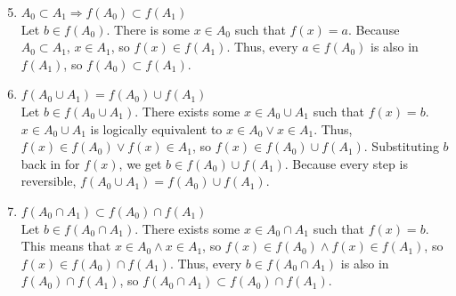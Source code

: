 \documentclass{article}
\begin{document}
\begin{enumerate}
\begin{enumerate}
                  \setcounter{enumii}{4}
                  \item $A_{0} \subset A_{1} \Rightarrow f(A_{0})  \subset f(A_{1})$\\
                        Let $b \in f(A_{0})$. There is some $x \in A_{0}$ such that $f(x) = a$. Because $A_{0} \subset A_{1}$, $x \in A_{1}$, so $f(x) \in f(A_{1})$. Thus, every $a \in f(A_{0})$ is also in $f(A_{1})$, so $f(A_{0}) \subset f(A_{1})$.
                  \item $f(A_{0} \cup A_{1}) = f(A_{0}) \cup f(A_{1})$\\
                        Let $b \in f(A_{0} \cup A_{1})$. There exists some $x \in A_{0} \cup A_{1}$ such that $f(x) = b$. $x \in A_{0} \cup A_{1}$ is logically equivalent to $x \in A_{0} \lor x \in A_{1}$. Thus, $f(x) \in f(A_{0}) \lor f(x) \in A_{1}$, so $f(x) \in f(A_{0}) \cup f(A_{1})$. Substituting $b$ back in for $f(x)$, we get $b \in f(A_{0}) \cup f(A_{1})$. Because every step is reversible, $f(A_{0} \cup A_{1}) = f(A_{0}) \cup f(A_{1})$.
                  \item $f(A_{0} \cap A_{1}) \subset f(A_{0}) \cap f(A_{1})$\\
                        Let $b \in f(A_{0} \cap A_{1})$. There exists some $x \in A_{0} \cap A_{1}$ such that $f(x) = b$. This means that $x \in A_{0} \land x \in A_{1}$, so $f(x) \in f(A_{0}) \land f(x) \in f(A_{1})$, so $f(x) \in f(A_{0}) \cap f(A_{1})$. Thus, every $b \in f(A_{0} \cap A_{1})$ is also in $f(A_{0}) \cap f(A_{1})$, so $f(A_{0} \cap A_{1}) \subset f(A_{0}) \cap f(A_{1})$.\\


\end{enumerate}
\end{enumerate}
\end{document}
